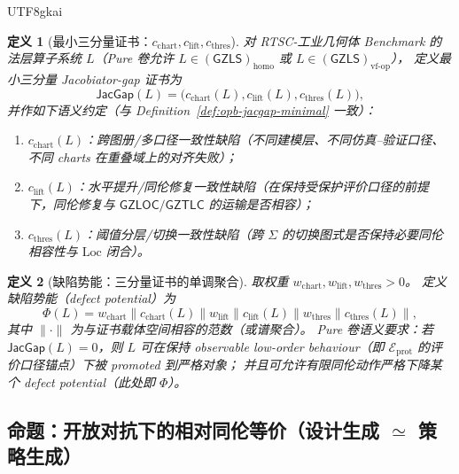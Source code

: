 \documentclass[12pt]{article}
\newtheorem{definition}{定义}[section]
\newcommand{\GZLS}{\ensuremath{\mathsf{GZLS}}}
\newcommand{\GZLOC}{\ensuremath{\mathsf{GZLOC}}}
\newcommand{\GZTLC}{\ensuremath{\mathsf{GZTLC}}}
\newcommand{\JacGap}{\ensuremath{\mathsf{JacGap}}}
\newcommand{\RTSC}{\textsf{RTSC}}
\begin{document}
\begin{CJK*}{UTF8}{gkai}
\begin{definition}[最小三分量证书：$c_{\mathrm{chart}},c_{\mathrm{lift}},c_{\mathrm{thres}}$]
\label{def:rtsc-ig-jacgap-minimal}
对 \RTSC{}-工业几何体 Benchmark 的法层算子系统 $L$（Pure 卷允许 $L\in(\GZLS)_{\mathrm{homo}}$ 或 $L\in(\GZLS)_{\mathrm{vf\text{-}op}}$），
定义最小三分量 Jacobiator-gap 证书为
\[
\JacGap(L)=\bigl(c_{\mathrm{chart}}(L),c_{\mathrm{lift}}(L),c_{\mathrm{thres}}(L)\bigr),
\]
并作如下语义约定（与 Definition~\ref{def:opb-jacgap-minimal} 一致）：
\begin{enumerate}
  \item $c_{\mathrm{chart}}(L)$：跨图册/多口径一致性缺陷（不同建模层、不同仿真--验证口径、不同 charts 在重叠域上的对齐失败）；
  \item $c_{\mathrm{lift}}(L)$：水平提升/同伦修复一致性缺陷（在保持受保护评价口径的前提下，同伦修复与 $\GZLOC/\GZTLC$ 的运输是否相容）；
  \item $c_{\mathrm{thres}}(L)$：阈值分层/切换一致性缺陷（跨 $\Sigma$ 的切换图式是否保持必要同伦相容性与 $\mathrm{Loc}$ 闭合）。
\end{enumerate}
\end{definition}

\begin{definition}[缺陷势能：三分量证书的单调聚合]
\label{def:rtsc-ig-defect-potential}
取权重 $w_{\mathrm{chart}},w_{\mathrm{lift}},w_{\mathrm{thres}}>0$。
定义缺陷势能（defect potential）为
\[
\Phi(L)
=
w_{\mathrm{chart}}\|c_{\mathrm{chart}}(L)\|
w_{\mathrm{lift}}\|c_{\mathrm{lift}}(L)\|
w_{\mathrm{thres}}\|c_{\mathrm{thres}}(L)\|,
\]
其中 $\|\cdot\|$ 为与证书载体空间相容的范数（或谱聚合）。
Pure 卷语义要求：若 $\JacGap(L)=0$，则 $L$ 可在保持 observable low-order behaviour（即 $\mathcal{E}_{\mathrm{prot}}$ 的评价口径锚点）下被
  promoted 到严格对象；
并且可允许有限同伦动作严格下降某个 defect potential（此处即 $\Phi$）。
\end{definition}

\subsection{命题：开放对抗下的相对同伦等价（设计生成 $\simeq$ 策略生成）}


\end{CJK*}
\end{document}
